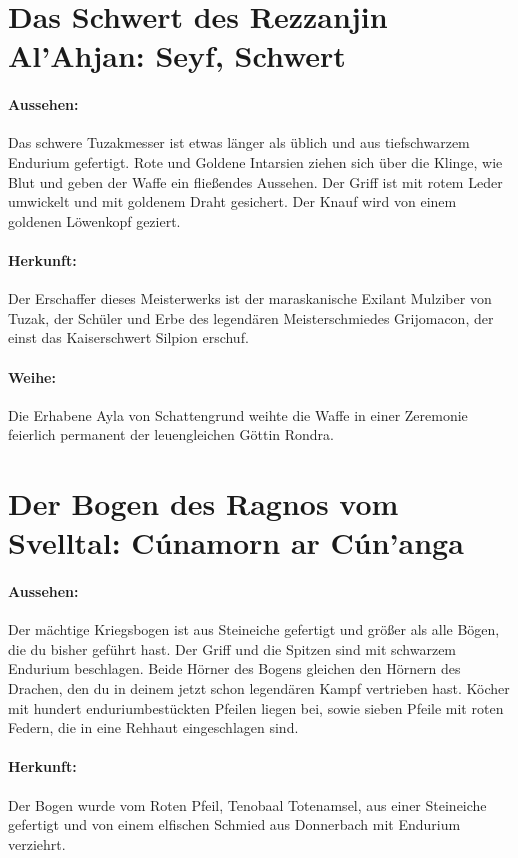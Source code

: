 \section{Das Schwert des Rezzanjin Al'Ahjan: Seyf, Schwert}

\paragraph{Aussehen:}
Das schwere Tuzakmesser ist etwas länger als üblich und aus tiefschwarzem Endurium gefertigt. Rote und Goldene Intarsien ziehen sich über die Klinge, wie Blut und geben der Waffe ein fließendes Aussehen. Der Griff ist mit rotem Leder umwickelt und mit goldenem Draht gesichert. Der Knauf wird von einem goldenen Löwenkopf geziert. 

\paragraph{Herkunft:}
Der Erschaffer dieses Meisterwerks ist der maraskanische Exilant Mulziber von Tuzak, der Schüler und Erbe des legendären Meisterschmiedes Grijomacon, der einst das Kaiserschwert Silpion erschuf.

\paragraph{Weihe:}
Die Erhabene Ayla von Schattengrund weihte die Waffe in einer Zeremonie feierlich permanent der leuengleichen Göttin Rondra.

\section{Der Bogen des Ragnos vom Svelltal: Cúnamorn ar Cún'anga}

\paragraph{Aussehen:}
Der mächtige Kriegsbogen ist aus Steineiche gefertigt und größer als alle Bögen, die du bisher geführt hast. Der Griff und die Spitzen sind mit schwarzem Endurium beschlagen. Beide Hörner des Bogens gleichen den Hörnern des Drachen, den du in deinem jetzt schon legendären Kampf vertrieben hast.
Köcher mit hundert enduriumbestückten Pfeilen liegen bei, sowie sieben Pfeile mit roten Federn, die in eine Rehhaut eingeschlagen sind.

\paragraph{Herkunft:}
Der Bogen wurde vom Roten Pfeil, Tenobaal Totenamsel, aus einer Steineiche gefertigt und von einem elfischen Schmied aus Donnerbach mit Endurium verziehrt.

